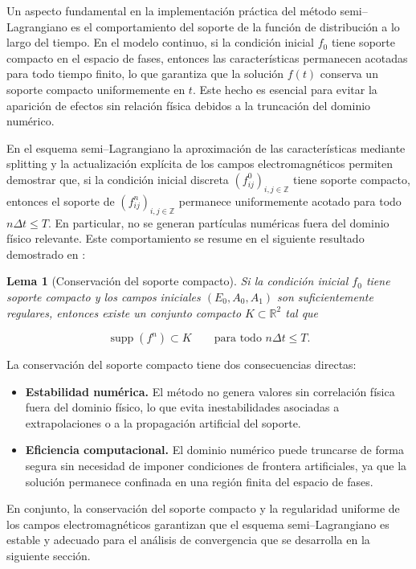 \documentclass[11pt,a4paper,twoside,pdf]{article}
\numberwithin{equation}{section}
\newtheorem{lemma}[theorem]{Lema}
\begin{document}
Un aspecto fundamental en la implementación práctica del método semi–Lagrangiano
es el comportamiento del soporte de la función de distribución a lo largo del tiempo.
En el modelo continuo, si la condición inicial $f_0$ tiene soporte compacto en el
espacio de fases, entonces las características permanecen acotadas para todo tiempo
finito, lo que garantiza que la solución $f(t)$ conserva un soporte compacto
uniformemente en $t$. Este hecho es esencial para evitar la aparición de efectos
sin relación física debidos a la truncación del dominio numérico.

En el esquema semi–Lagrangiano la aproximación de
las características mediante splitting y la actualización explícita de los campos
electromagnéticos permiten demostrar que, si la condición inicial discreta
$(f^0_{ij})_{i,j\in\mathbb{Z}}$ tiene soporte compacto, entonces el soporte de
$(f^n_{ij})_{i,j\in\mathbb{Z}}$ permanece uniformemente acotado para todo
$n\Delta t\le T$. En particular, no se generan partículas numéricas fuera del dominio
físico relevante. Este comportamiento se resume en el siguiente resultado demostrado en \cite{bostan2009convergence}:

\begin{lemma}[Conservación del soporte compacto]
Si la condición inicial $f_0$ tiene soporte compacto y los campos iniciales
$(E_0,A_0,A_1)$ son suficientemente regulares, entonces existe un conjunto compacto
$K\subset\mathbb{R}^2$ tal que


\[
\operatorname{supp}(f^n)\subset K \qquad \text{para todo } n\Delta t\le T.
\]


\end{lemma}

La conservación del soporte compacto tiene dos consecuencias directas:

\begin{itemize}
\item \textbf{Estabilidad numérica.}  
El método no genera valores sin correlación física fuera del dominio físico, lo que evita
inestabilidades asociadas a extrapolaciones o a la propagación artificial del
soporte.

\item \textbf{Eficiencia computacional.}  
El dominio numérico puede truncarse de forma segura sin necesidad de imponer
condiciones de frontera artificiales, ya que la solución permanece confinada en
una región finita del espacio de fases.
\end{itemize}

En conjunto, la conservación del soporte compacto y la regularidad uniforme de los
campos electromagnéticos garantizan que el esquema semi–Lagrangiano es estable y
adecuado para el análisis de convergencia que se desarrolla en la siguiente sección.
\end{document}
